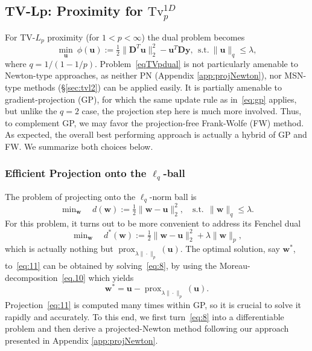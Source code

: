 \documentclass[twoside,11pt]{article}
\newcommand{\vu}{\bm{u}}       \newcommand{\vuh}{\hat{\bm{u}}}        \newcommand{\uh}{\hat{u}}    \newcommand{\vut}{\tilde{\bm{u}}}       \newcommand{\ut}{\tilde{u}}
\newcommand{\vw}{\bm{w}}       \newcommand{\vwh}{\hat{\bm{w}}}        \newcommand{\wh}{\hat{w}}    \newcommand{\vwt}{\tilde{\bm{w}}}       \newcommand{\wt}{\tilde{w}}
\newcommand{\vy}{\bm{y}}       \newcommand{\vyh}{\hat{\bm{y}}}        \newcommand{\yh}{\hat{y}}    \newcommand{\vyt}{\tilde{\bm{y}}}       \newcommand{\yt}{\tilde{y}}
\newcommand{\md}{\bm{D}}
\newcommand{\mynorm}[2]{\| {#1} \|_{#2}}
\newcommand{\norm}[2]{\mynorm{#1}{#2}}
\newcommand{\enorm}[1]{\mynorm{#1}{2}}
\DeclareMathOperator{\prox}{prox}
\newcommand{\nlmin}{\min\nolimits}
\newcommand{\half}{\tfrac{1}{2}}
\newcommand{\tvell}{\text{Tv}}
\numberwithin{equation}{section}
\numberwithin{theorem}{section}
\begin{document}
\subsection{TV-Lp: Proximity for $\tvell_p^{1D}$}
\label{sec:tvp}
For TV-$L_p$ proximity (for $1 < p < \infty$) the dual problem becomes
\begin{equation}
  \label{eqTVpdual}
  \min_{\vu}\ \phi(\vu) := \half\enorm{\md^T\vu}^2 - \vu^T\md\vy,\ \ \text{s.t.}\ \norm{\vu}{q} \le \lambda,
\end{equation}
where $q = 1 / (1 - 1/p)$.  Problem~\eqref{eqTVpdual} is not particularly amenable to Newton-type approaches, as neither PN (Appendix \ref{app:projNewton}), nor MSN-type methods (\S\ref{sec:tvl2}) can be applied easily. It is partially amenable to gradient-projection (GP), for which the same update rule as in~\eqref{eq:gp} applies, but unlike the $q=2$ case, the projection step here is much more involved. Thus, to complement GP, we may favor the projection-free Frank-Wolfe (FW) method. As expected, the overall best performing approach is actually a hybrid of GP and FW. We summarize both choices below.

\subsubsection{Efficient Projection onto the $\ell_q$-ball}

The problem of projecting onto the $\ell_q$-norm ball is
\begin{equation}
  \label{eq:11}
  \min\nolimits_{\vw}\quad d(\vw) := \half \enorm{\vw - \vu}^2,\quad \text{s.t.}\ \ \norm{\vw}{q} \leq \lambda.
\end{equation}
For this problem, it turns out to be more convenient to address its Fenchel dual
\begin{equation}
  \label{eq:8}
  \nlmin_{\vw}\quad d^*(\vw) := \half \enorm{\vw - \vu}^2  +  \lambda \norm{\vw}{p},
\end{equation}
which is actually nothing but $\prox_{\lambda\norm{\cdot}{p}}(\vu)$. The optimal solution, say $\vw^*$, to~\eqref{eq:11} can be obtained by solving~\eqref{eq:8}, by using the  Moreau-decomposition~\eqref{eq.10} which yields
\begin{equation*}
  \vw^* = \vu - \prox_{\lambda\norm{\cdot}{p}}(\vu).
\end{equation*}
Projection~\eqref{eq:11} is computed many times within GP, so it is crucial to solve it rapidly and accurately. To this end, we first turn~\eqref{eq:8} into a differentiable problem and then derive a projected-Newton method following our approach presented in Appendix \ref{app:projNewton}.
\end{document}
